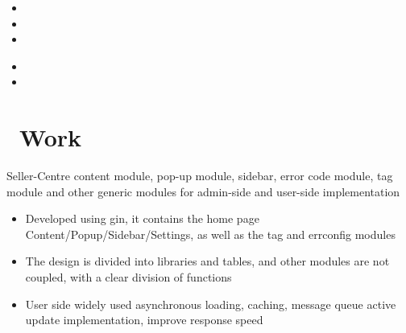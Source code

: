 \documentclass{resume}
\newcommand{\en}[1]{#1}
\newcommand{\zh}[1]{}
\begin{document}
\en{}
\zh{\datedsubsection{\textbf{\href{https://www.sea.com/products/shopee/}{深圳虾皮信息科技发展有限公司}}}{2021/07 -- 12/2022}}
\en{}
\zh{\role{卖家平台}{后端软件工程师}}
\begin{itemize}[parsep=0.5ex]
      \item \en{}
            \zh{负责 Shopee 卖家主站首页(内容/弹窗/侧边栏等), Seller 通用 Feature Toggle(多地区黑白名单) 等项目(项目 owner)}
      \item \en{}
            \zh{参与内部项目 Python->Go 的重构,参与 API 网关新版本发布优化实现以及业务插件的开发,参与其它需求的开发(内容包括但不限于 otp/google oauth/s3 等等)}
      \item \en{}
            \zh{工作中能独立按需按时完成需求设计和实现}
\end{itemize}

\en{}
\zh{\datedsubsection{\textbf{\href{https://www.sea.com/products/shopee/}{深圳虾皮信息科技发展有限公司}}}{2021/07 -- 12/2022}}
\en{}
\zh{\role{开放平台(开发者平台)}{后端软件工程师}}
\begin{itemize}[parsep=0.5ex]
      \item \en{}
            \zh{负责内部 PartnerShip 项目(owner,类似 ToB 充值兑换券码平台)}
      \item \en{}
            \zh{负责 OpenAPI 平台的需求开发,负责部分技术优化的开发}
\end{itemize}

\section{\faGithubAlt\ \en{Work}\zh{工作项目}}
\en{Seller-Centre content module, pop-up module, sidebar, error code module, tag module and other generic modules for admin-side and user-side implementation}
\zh{Seller-Centre 内容模块、弹窗模块、侧边栏、错误码模块、标签模块以及其它业务模块的 admin 端和 user 端实现}
\begin{itemize}
      \item \en{Developed using gin, it contains the home page Content/Popup/Sidebar/Settings, as well as the tag and errconfig modules}
            \zh{项目 owner,使用 gin 开发,包含首页内容、弹窗、侧边栏、错误码、标签等模块}
      \item \en{The design is divided into libraries and tables, and other modules are not coupled, with a clear division of functions}
            \zh{数据上分库分表,设计上功能划分清晰,业务拓展性强}
      \item \en{User side widely used asynchronous loading, caching, message queue active update implementation, improve response speed}
            \zh{广泛使用异步加载、缓存、消息 等方式提高用户体验}
\end{itemize}
\end{document}
